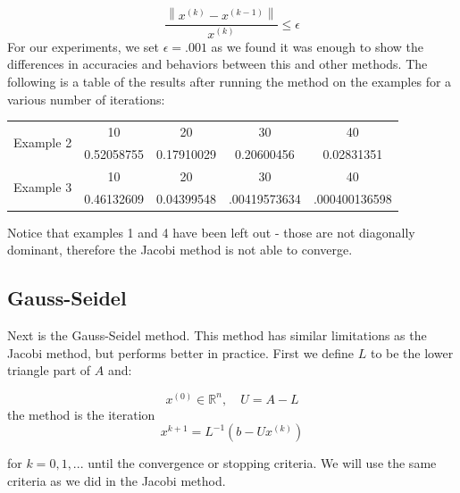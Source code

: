 \documentclass[11pt]{article}	%
\newcommand\norm[1]{\left\lVert#1\right\rVert}
\begin{document}
    \begin{equation}
        \frac{\norm{x^{(k)} - x^{(k-1)}}}{x^{(k)}} \leq \epsilon
    \end{equation}
    For our experiments, we set $\epsilon = .001$ as we found it was enough to show the differences in accuracies and behaviors between this and other methods. The following is a table of the results after running the method on the examples for a various number of iterations:
    \begin{center}
        \begin{tabular}{||c|c|c|c|c||}
            \hline
            \multirow{2}{5em}{Example 2} & 10 & 20 & 30 & 40 \\ [.25em]
            & 0.52058755 & 0.17910029 & 0.20600456 & 0.02831351 \\ [.25em]
            \hline \hline
            \multirow{2}{5em}{Example 3} & 10 & 20 & 30 & 40 \\ [.25em]
            & 0.46132609 & 0.04399548 & .00419573634 & .000400136598 \\ [.25em]
            \hline
        \end{tabular}
    \end{center}

    Notice that examples 1 and 4 have been left out - those are not diagonally dominant, therefore the Jacobi method
    is not able to converge.

\subsection{Gauss-Seidel}
Next is the Gauss-Seidel method. This method has similar limitations as the Jacobi method, but performs better in practice.
First we define $L$ to be the lower triangle part of $A$ and:

\begin{equation}\label{eq:jacobi-eq-1}
     x^{(0)}\in {\mathbb R}^n, \quad U = A - L
\end{equation}
the method is the iteration
\begin{equation}\label{eq:jacobi-eq-1}
    x^{k+1} = L^{-1}(b - Ux^{(k)})
\end{equation}

for $k = 0, 1, ...$ until the convergence or stopping criteria. We will use the same criteria as we did in the Jacobi method.
\end{document}
